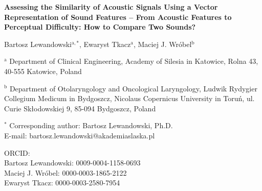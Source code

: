 \documentclass[11pt]{article}
\begin{document}
\begin{center}
{\Large\bfseries Assessing the Similarity of Acoustic Signals Using a Vector Representation of Sound Features -- From Acoustic Features to Perceptual Difficulty: How to Compare Two Sounds?\par}

\vspace{1.5em}
{\large Bartosz Lewandowski$^{\mathrm{a},*}$, Ewaryst Tkacz$^{\mathrm{a}}$, Maciej J. Wróbel$^{\mathrm{b}}$\par}
\end{center}

\vspace{1em}
\noindent$^{\mathrm{a}}$ Department of Clinical Engineering, Academy of Silesia in Katowice, Rolna 43, 40-555 Katowice, Poland

\noindent$^{\mathrm{b}}$ Department of Otolaryngology and Oncological Laryngology, Ludwik Rydygier Collegium Medicum in Bydgoszcz, Nicolaus Copernicus University in Toruń, ul. Curie Skłodowskiej 9, 85-094 Bydgoszcz, Poland

\vspace{1.5em}
\noindent$^{*}$ Corresponding author: Bartosz Lewandowski, Ph.D.\\
E-mail: bartosz.lewandowski@akademiaslaska.pl

\vspace{1.5em}
\noindent ORCID:\\
Bartosz Lewandowski: 0009-0004-1158-0693\\
Maciej J. Wróbel: 0000-0003-1865-2122\\
Ewaryst Tkacz: 0000-0003-2580-7954
\end{document}
